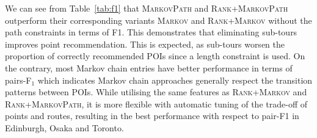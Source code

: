 We can see from Table~\ref{tab:f1} that \textsc{MarkovPath} and \textsc{Rank+MarkovPath}
outperform their corresponding variants \textsc{Markov} and \textsc{Rank+Markov} without the path constraints in terms of F1.
This demonstrates that eliminating sub-tours improves point recommendation.
This is expected, as sub-tours worsen the proportion of correctly
recommended POIs since a length constraint is used.
On the contrary, most Markov chain entries have better performance in terms of pairs-F$_1$
which indicates Markov chain approaches generally
respect the transition patterns between POIs.
%
While utilising the same features as \textsc{Rank+Markov} and \textsc{Rank+MarkovPath},
it is more flexible with automatic tuning of the trade-off of points and routes, resulting in
the best performance with respect to pair-F1 in Edinburgh, Osaka and Toronto.


